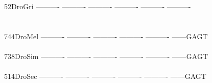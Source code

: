 \documentclass[11pt,twoside,reqno,a4paper]{article}
\begin{document}
{52\hspace*{3\charwidth}DroGri	----------	----------	----------	----------	----------	----------	\\
\hspace*{5\charwidth}\hspace*{7\charwidth}\hspace*{1\charwidth}\hspace*{1\charwidth}\hspace*{1\charwidth}\hspace*{1\charwidth}\hspace*{1\charwidth}\hspace*{1\charwidth}\\
\\
744\hspace*{2\charwidth}DroMel	----------	----------	----------	----------	----------	------GAGT	\\
\hspace*{5\charwidth}\hspace*{7\charwidth}\hspace*{1\charwidth}\hspace*{1\charwidth}\hspace*{1\charwidth}\hspace*{1\charwidth}\hspace*{1\charwidth}\hspace*{1\charwidth}\\
738\hspace*{2\charwidth}DroSim	----------	----------	----------	----------	----------	------GAGT	\\
\hspace*{5\charwidth}\hspace*{7\charwidth}\hspace*{1\charwidth}\hspace*{1\charwidth}\hspace*{1\charwidth}\hspace*{1\charwidth}\hspace*{1\charwidth}\hspace*{1\charwidth}\\
514\hspace*{2\charwidth}DroSec	----------	----------	----------	----------	----------	------GAGT	\\
\hspace*{5\charwidth}\hspace*{7\charwidth}\hspace*{1\charwidth}\hspace*{1\charwidth}\hspace*{1\charwidth}\hspace*{1\charwidth}\hspace*{1\charwidth}\hspace*{1\charwidth}\\
}
\end{document}
